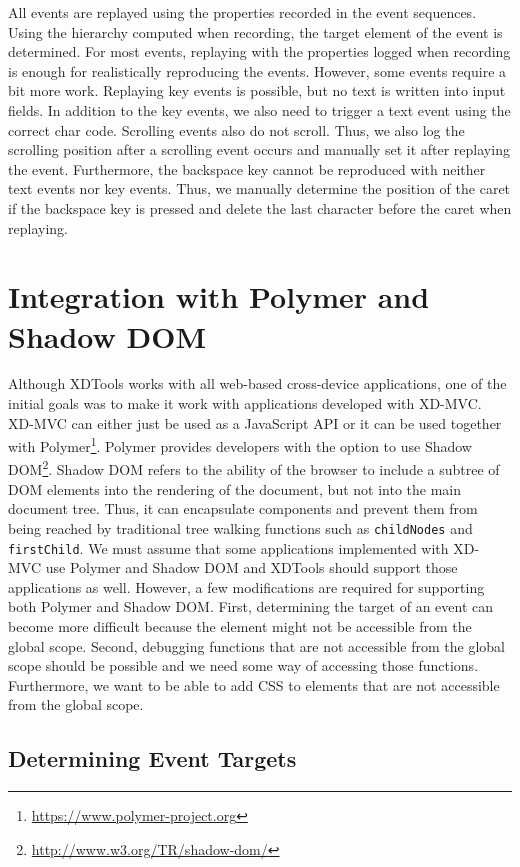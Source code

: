 All events are replayed using the properties recorded in the event sequences. Using the hierarchy computed when recording, the target element of the event is determined. For most events, replaying with the properties logged when recording is enough for realistically reproducing the events. However, some events require a bit more work. Replaying key events is possible, but no text is written into input fields. In addition to the key events, we also need to trigger a text event using the correct char code. Scrolling events also do not scroll. Thus, we also log the scrolling position after a scrolling event occurs and manually set it after replaying the event. Furthermore, the backspace key cannot be reproduced with neither text events nor key events. Thus, we manually determine the position of the caret if the backspace key is pressed and delete the last character before the caret when replaying. 

\section{Integration with Polymer and Shadow DOM}

Although XDTools works with all web-based cross-device applications, one of the initial goals was to make it work with applications developed with XD-MVC. XD-MVC can either just be used as a JavaScript API or it can be used together with Polymer\footnote{\url{https://www.polymer-project.org}}. Polymer provides developers with the option to use Shadow DOM\footnote{\url{http://www.w3.org/TR/shadow-dom/}}. Shadow DOM refers to the ability of the browser to include a subtree of DOM elements into the rendering of the document, but not into the main document tree. Thus, it can encapsulate components and prevent them from being reached by traditional tree walking functions such as \lstinline|childNodes| and \lstinline|firstChild|. We must assume that some applications implemented with XD-MVC use Polymer and Shadow DOM and XDTools should support those applications as well. However, a few modifications are required for supporting both Polymer and Shadow DOM. First, determining the target of an event can become more difficult because the element might not be accessible from the global scope. Second, debugging functions that are not accessible from the global scope should be possible and we need some way of accessing those functions. Furthermore, we want to be able to add CSS to elements that are not accessible from the global scope.

\subsection{Determining Event Targets}

